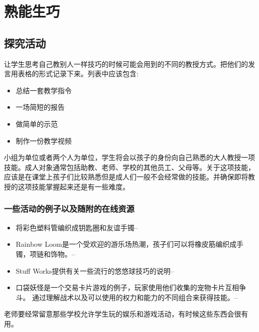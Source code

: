 \chapter{熟能生巧}

\section{探究活动}
    让学生思考自己教别人一样技巧的时候可能会用到的不同的教授方式。把他们的发言用表格的形式记录下来。列表中应该包含:\par
    \begin{itemize}
      \item 总结一套教学指令
      \item 一场简短的报告
      \item 做简单的示范 
      \item 制作一份教学视频  
    \end{itemize}  
    
    小组为单位或者两个人为单位，学生将会以孩子的身份向自己熟悉的大人教授一项技能。成人对象通常包括助教、老师、学校的其他员工、父母等。关于这项技能，应该是在课堂上孩子们比较熟悉但是成人们一般不会经常做的技能。并确保即将教授的这项技能掌握起来还是有一些难度。\par
\subsection{一些活动的例子以及随附的在线资源}    
    
   \begin{itemize}
      \item  将彩色塑料管编织成钥匙圈和友谊手镯--
      \item  Rainbow Loom是一个受欢迎的游乐场热潮，孩子们可以将橡皮筋编织成手镯，项链和饰物。--
      \item  Stuff Works提供有关一些流行的悠悠球技巧的说明--
      \item  口袋妖怪是一个交易卡片游戏的例子，玩家使用他们收集的宠物卡片互相争斗。 通过理解战术以及可以使用的权力和能力的不同组合来获得技能。--
    \end{itemize}  

   \begin{note}
     老师要经常留意那些学校允许学生玩的娱乐和游戏活动，有时候这些东西会很有用。
   \end{note}  
   

